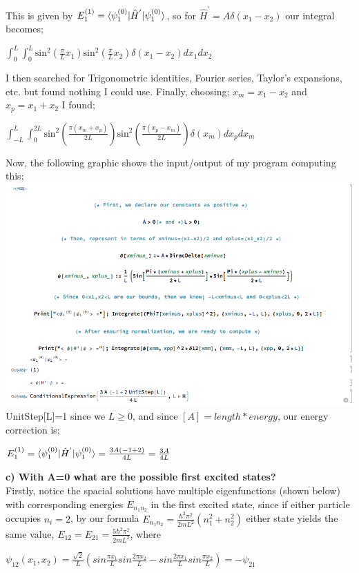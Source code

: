 \documentclass{journal}
\begin{document}
This is given by $E_1^{(1)}=\braket{\psi_1^{(0)}|\hat{H}^{'}|\psi_1^{(0)}}$, so for $\hat{H}^{'}=A\delta(x_1-x_2)$ our integral becomes;\\
\begin{center}
$ {\displaystyle\int_0^L}{\displaystyle\int_0^L}\text{sin}^2(\frac\pi{L}x_1)\text{sin}^2(\frac\pi{L}x_2)\delta(x_1-x_2)dx_1dx_2 $\\
\end{center}
I then searched for Trigonometric identities, Fourier series, Taylor's expansions, etc. but found nothing I could use. Finally, choosing; $x_m=x_1-x_2$ and $x_p=x_1+x_2$ I found;\\
\begin{center}

$ {\displaystyle\int_{-L}^L}{\displaystyle\int_0^{2L}}\text{sin}^2(\frac{\pi(x_m+x_p)}{2L})\text{sin}^2(\frac{\pi(x_p-x_m)}{2L})\delta(x_m)dx_pdx_m $\\

\end{center}
Now, the following graphic shows the input/output of my program computing this;\\
\includegraphics[width=1.1\linewidth]{ABC.png}\\
UnitStep[L]=1 since we $L\geq0$, and since $[A]=length*energy$, our energy correction is;\\
\begin{center}
\large
    $E_{1}^{(1)}=\braket{\psi_1^{(0)}|\hat{H}^{'}|\psi_1^{(0)}}=\frac{3A(-1+2)}{4L}=\frac{3A}{4L}$
\end{center}
\pagebreak
\textbf{c) With A=0 what are the possible first excited states?}\\
Firstly, notice the spacial solutions have multiple eigenfunctions (shown below) with corresponding energies $E_{n_1n_2}$ in the first excited state, since if either particle occupies $n_i=2$, by our formula
$E_{n_1n_2}=\frac{\hbar^2\pi^2}{2mL^2}(n_1^2+n_2^2)$ either state  yields the same value,  $E_{12}=E_{21}=\frac{5\hbar^2\pi^2}{2mL^2}$, where
\begin{center}
$\psi_{12}(x_1,x_2)=\frac{\sqrt2}{L}(sin\frac{\pi x_1}{L}sin\frac{2\pi x_2}{L}-sin\frac{2\pi x_1}{L}sin\frac{\pi x_2}{L})=-\psi_{21}$\\    
\end{center}
\end{document}

